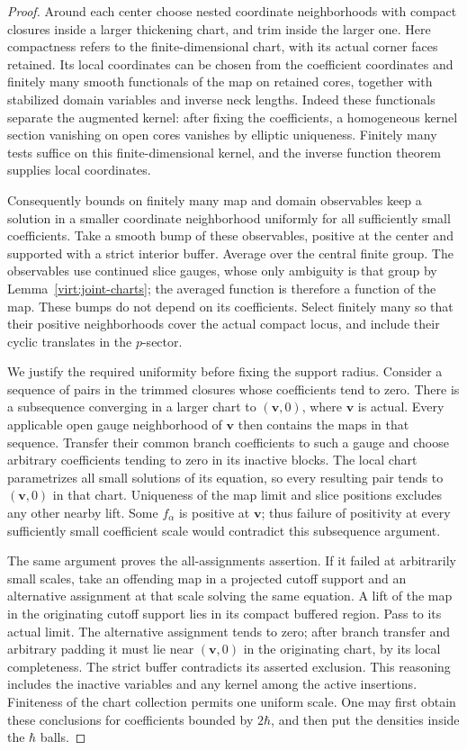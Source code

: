 \begin{proof}
Around each center choose nested coordinate neighborhoods with compact
closures inside a larger thickening chart, and trim inside the larger
one.  Here compactness refers to the finite-dimensional chart, with its
actual corner faces retained.  Its local coordinates can be chosen from
the coefficient coordinates and finitely many smooth functionals of the
map on retained cores, together with stabilized domain variables and
inverse neck lengths.  Indeed these functionals separate the augmented
kernel: after fixing the coefficients, a homogeneous kernel section
vanishing on open cores vanishes by elliptic uniqueness.  Finitely many
tests suffice on this finite-dimensional kernel, and the inverse
function theorem supplies local coordinates.

Consequently bounds on finitely many map and domain observables keep a
solution in a smaller coordinate neighborhood uniformly for all
sufficiently small coefficients.  Take a smooth bump of these
observables, positive at the center and supported with a strict interior
buffer.  Average over the central finite group.  The observables use
continued slice gauges, whose only ambiguity is that group by
Lemma~\ref{virt:joint-charts}; the averaged function is therefore a
function of the map.  These bumps do not depend on its coefficients.
Select finitely many so that their positive neighborhoods cover the
actual compact locus, and include their cyclic translates in the
$p$-sector.

We justify the required uniformity before fixing the support radius.
Consider a sequence of pairs in the trimmed closures whose coefficients
tend to zero.  There is a subsequence converging in a larger chart to
$(\mathbf v,0)$, where $\mathbf v$ is actual.  Every applicable open
gauge neighborhood of $\mathbf v$ then contains the maps in that
sequence.  Transfer their common branch coefficients to such a gauge
and choose arbitrary coefficients tending to zero in its inactive
blocks.  The local chart parametrizes all small solutions of its
equation, so every resulting pair tends to $(\mathbf v,0)$ in that chart.
Uniqueness of the map limit and slice positions excludes any other
nearby lift.  Some $f_\alpha$ is positive at $\mathbf v$; thus failure
of positivity at every sufficiently small coefficient scale would
contradict this subsequence argument.

The same argument proves the all-assignments assertion.  If it failed
at arbitrarily small scales, take an offending map in a projected cutoff
support and an alternative assignment at that scale solving the same
equation.  A lift of the map in the originating cutoff support lies in
its compact buffered region.  Pass to its actual limit.  The alternative
assignment tends to zero; after branch transfer and arbitrary padding
it must lie near $(\mathbf v,0)$ in the originating chart, by its local
completeness.  The strict buffer contradicts its asserted exclusion.
This reasoning includes the inactive variables and any kernel among
the active insertions.  Finiteness of the chart collection permits one
uniform scale.  One may first obtain these conclusions for coefficients
bounded by $2\hbar$, and then put the densities inside the $\hbar$ balls.


\end{proof}
